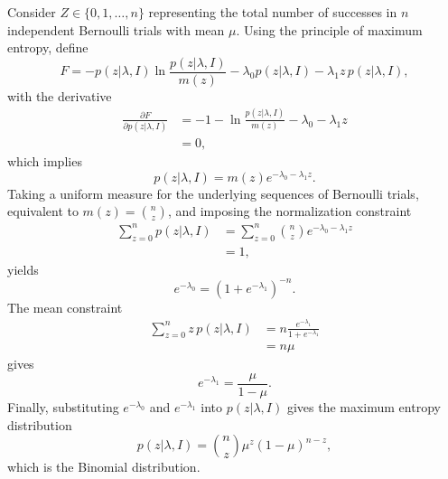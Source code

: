 \begin{example}
	Consider $Z \in \{0,1,\dots,n\}$ representing the total number of successes in $n$ independent Bernoulli trials with mean $\mu$. Using the principle of maximum entropy, define
	\begin{equation}
		F = - p(z|\lambda,I) \ln \frac{p(z|\lambda,I)}{m(z)} - \lambda_0 p(z|\lambda,I) - \lambda_1 z\, p(z|\lambda,I),
	\end{equation}
	with the derivative
	\begin{equation}
		\begin{split}
			\frac{\partial F}{\partial p(z|\lambda,I)} &= -1 - \ln \frac{p(z|\lambda,I)}{m(z)} - \lambda_0 - \lambda_1 z\\
			& = 0,
		\end{split}
	\end{equation}
	which implies
	\begin{equation}
		p(z|\lambda,I) = m(z) e^{-\lambda_0 - \lambda_1 z}.
	\end{equation}
	Taking a uniform measure for the underlying sequences of Bernoulli trials, equivalent to $m(z) = \binom{n}{z}$, and imposing the normalization constraint
	\begin{equation}
		\begin{split}
			\sum_{z=0}^n p(z|\lambda,I) &= \sum_{z=0}^n \binom{n}{z} e^{-\lambda_0 - \lambda_1 z}\\
			& = 1,
		\end{split}
	\end{equation}
	yields
	\begin{equation}
		e^{-\lambda_0} = (1 + e^{-\lambda_1})^{-n}.
	\end{equation}
	The mean constraint
	\begin{equation}
		\begin{split}
			\sum_{z=0}^n z\, p(z|\lambda,I) &= n \frac{e^{-\lambda_1}}{1 + e^{-\lambda_1}}\\
			& = n\mu
		\end{split}
	\end{equation}
	gives
	\begin{equation}
		e^{-\lambda_1} = \frac{\mu}{1-\mu}.
	\end{equation}
	Finally, substituting $e^{-\lambda_0}$ and $e^{-\lambda_1}$ into $p(z|\lambda,I)$ gives the maximum entropy distribution
	\begin{equation}
		p(z|\lambda,I) = \binom{n}{z} \mu^z (1-\mu)^{n-z},
	\end{equation}
	which is the Binomial distribution.
\end{example}



